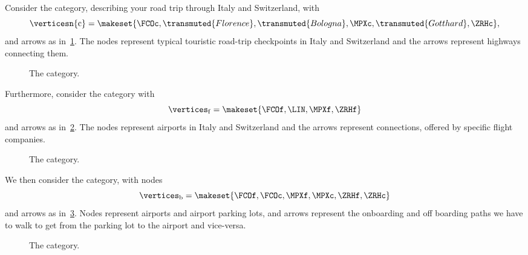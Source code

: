 \begin{example}
    \label{exa:car-category}
    Consider the \Car category, describing your road trip through Italy and Switzerland, with
    \begin{equation}
        \verticesn{\mathrm{c}}=
        \makeset{
            \FCOc,
            \transmuted{Florence},
            \transmuted{Bologna},
            \MPXc,
            \transmuted{Gotthard},
            \ZRHc
        },
    \end{equation}
    and arrows as in~\cref{fig:carcat}.
    The nodes represent typical touristic road-trip checkpoints in Italy and Switzerland and the arrows represent highways connecting them.

    \begin{figure}[h!]
        \caption{The \Car category.}
        \label{fig:carcat}
    \end{figure}

    Furthermore, consider the \Flight category with
    \begin{equation}
        \vertices_\mathrm{f}
        = \makeset{
            \FCOf,
            \LIN,
            \MPXf,
            \ZRHf
        }
    \end{equation}
    and arrows as in~\cref{fig:flight}.
    The nodes represent airports in Italy and Switzerland and the arrows represent connections, offered by specific flight companies.

    \begin{figure}[h!]
        \centering
        \caption{The \Flight category.}
        \label{fig:flight}
    \end{figure}

    We then consider the \Board category, with nodes
    \begin{equation}
        \vertices_\mathrm{b}=\makeset{\FCOf,\FCOc,\MPXf,\MPXc,\ZRHf,\ZRHc}
    \end{equation}
    and arrows as in~\cref{fig:boarding}.
    Nodes represent airports and airport parking lots, and arrows represent the onboarding and off boarding paths we have to walk to get from the parking lot to the airport and vice-versa.

    \begin{figure}[h!]
        \centering
        \caption{The \Board category. }
        \label{fig:boarding}
    \end{figure}


\end{example}
